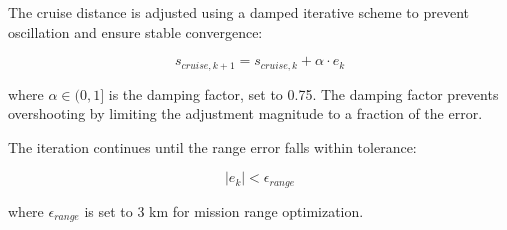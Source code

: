 The cruise distance is adjusted using a damped iterative scheme to prevent oscillation and ensure stable convergence:

\begin{equation}
s_{cruise,k+1} = s_{cruise,k} + \alpha \cdot e_k
\end{equation}

where $\alpha \in (0,1]$ is the damping factor, set to 0.75. The damping factor prevents overshooting by limiting the adjustment magnitude to a fraction of the error.

The iteration continues until the range error falls within tolerance:

\begin{equation}
|e_k| < \epsilon_{range}
\end{equation}

where $\epsilon_{range}$ is set to 3 km for mission range optimization.

